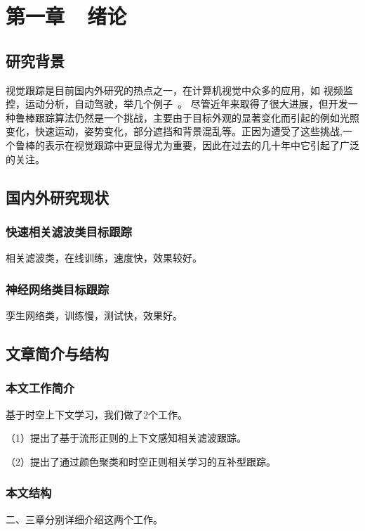 ﻿\chapter*{\hfill 第一章~~绪论 \hfill} %
\label{chap00}

\section{研究背景}
视觉跟踪是目前国内外研究的热点之一，在计算机视觉中众多的应用，如
视频监控，运动分析，自动驾驶，举几个例子~\cite{li2013survey,wangvisual,ali2016visual,zhang2018visual,zhang2018visualtracker}。 尽管近年来取得了很大进展，但开发一种鲁棒跟踪算法仍然是一个挑战，主要由于目标外观的显著变化而引起的例如光照变化，快速运动，姿势变化，部分遮挡和背景混乱等。正因为遭受了这些挑战,一个鲁棒的表示在视觉跟踪中更显得尤为重要，因此在过去的几十年中它引起了广泛的关注。





\section{国内外研究现状}


\subsection{快速相关滤波类目标跟踪}

相关滤波类，在线训练，速度快，效果较好。

\subsection{神经网络类目标跟踪}

孪生网络类，训练慢，测试快，效果好。


\section{文章简介与结构}

\subsection{本文工作简介}

基于时空上下文学习，我们做了2个工作。

（1）提出了基于流形正则的上下文感知相关滤波跟踪。

（2）提出了通过颜色聚类和时空正则相关学习的互补型跟踪。



\subsection{本文结构}

二、三章分别详细介绍这两个工作。


